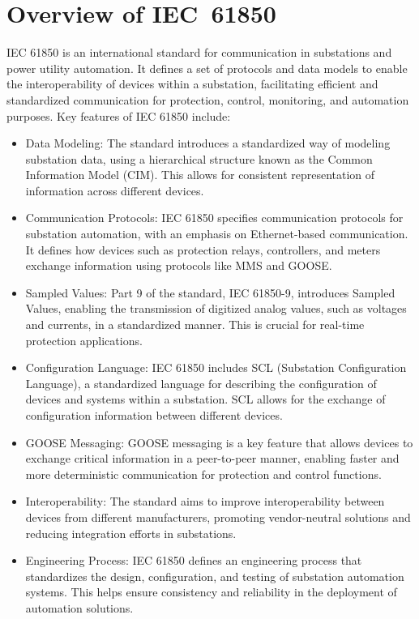 \section{Overview of IEC~61850}
IEC 61850 is an international standard for communication in substations and power utility automation. It defines a set of protocols and data models to enable the interoperability of devices within a substation, facilitating efficient and standardized communication for protection, control, monitoring, and automation purposes. Key features of IEC 61850 include:

\begin{itemize}
	\item Data Modeling: The standard introduces a standardized way of modeling substation data, using a hierarchical structure known as the Common Information Model (CIM). This allows for consistent representation of information across different devices.
	\item Communication Protocols: IEC 61850 specifies communication protocols for substation automation, with an emphasis on Ethernet-based communication. It defines how devices such as protection relays, controllers, and meters exchange information using protocols like MMS and GOOSE.
	\item Sampled Values: Part 9 of the standard, IEC 61850-9, introduces Sampled Values, enabling the transmission of digitized analog values, such as voltages and currents, in a standardized manner. This is crucial for real-time protection applications.
	\item Configuration Language: IEC 61850 includes SCL (Substation Configuration Language), a standardized language for describing the configuration of devices and systems within a substation. SCL allows for the exchange of configuration information between different devices.
	\item GOOSE Messaging: GOOSE messaging is a key feature that allows devices to exchange critical information in a peer-to-peer manner, enabling faster and more deterministic communication for protection and control functions.
	\item Interoperability: The standard aims to improve interoperability between devices from different manufacturers, promoting vendor-neutral solutions and reducing integration efforts in substations.
	\item Engineering Process: IEC 61850 defines an engineering process that standardizes the design, configuration, and testing of substation automation systems. This helps ensure consistency and reliability in the deployment of automation solutions.
\end{itemize}

